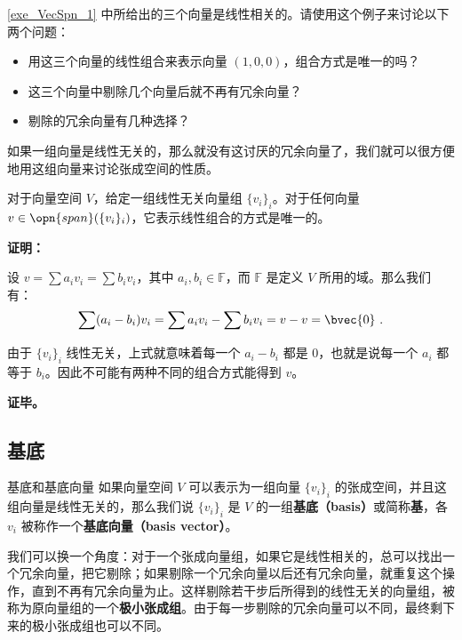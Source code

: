 \begin{exercise}{}
\autoref{exe_VecSpn_1} 中所给出的三个向量是线性相关的。请使用这个例子来讨论以下两个问题：
\begin{itemize}
\item 用这三个向量的线性组合来表示向量 $(1,0,0)$，组合方式是唯一的吗？
\item 这三个向量中剔除几个向量后就不再有冗余向量？
\item 剔除的冗余向量有几种选择？
\end{itemize}
\end{exercise}

如果一组向量是线性无关的，那么就没有这讨厌的冗余向量了，我们就可以很方便地用这组向量来讨论张成空间的性质。

\begin{theorem}{}
对于向量空间 $V$，给定一组线性无关向量组 $\{v_i\}_i$。对于任何向量 $v \in \opn{span}(\{v_i\}_i)$，它表示线性组合的方式是唯一的。
\end{theorem}
\textbf{证明：}

设 $v = \sum a_i v_i = \sum b_i v_i$，其中 $a_i, b_i\in \mathbb{F}$，而 $\mathbb{F}$ 是定义 $V$ 所用的域。那么我们有：
\begin{equation}
\sum(a_i - b_i) v_i = \sum a_i v_i - \sum b_i v_i =  v - v =  \bvec{0}~.
\end{equation}

由于 $\{v_i\}_i$ 线性无关，上式就意味着每一个 $a_i-b_i$ 都是 $0$，也就是说每一个 $a_i$ 都等于 $b_i$。因此不可能有两种不同的组合方式能得到 $v$。

\textbf{证毕。}

\subsection{基底}

\begin{definition}{基底和基底向量}\label{def_VecSpn_2}
如果向量空间 $V$ 可以表示为一组向量 $\{v_i\}_i$ 的张成空间，并且这组向量是线性无关的，那么我们说 $\{v_i\}_i$ 是 $V$ 的一组\textbf{基底（basis）}或简称\textbf{基}，各 $v_i$ 被称作一个\textbf{基底向量（basis vector）}。
\end{definition}

我们可以换一个角度：对于一个张成向量组，如果它是线性相关的，总可以找出一个冗余向量，把它剔除；如果剔除一个冗余向量以后还有冗余向量，就重复这个操作，直到不再有冗余向量为止。这样剔除若干步后所得到的线性无关的向量组，被称为原向量组的一个\textbf{极小张成组}。由于每一步剔除的冗余向量可以不同，最终剩下来的极小张成组也可以不同。

